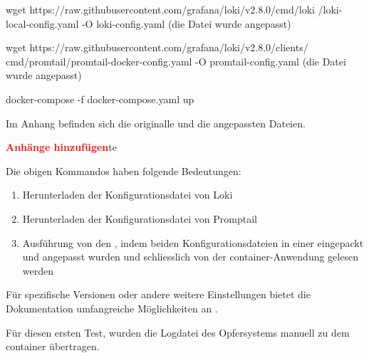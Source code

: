 {
\begin{spverbatim}
wget https://raw.githubusercontent.com/grafana/loki/v2.8.0/cmd/loki
/loki-local-config.yaml -O loki-config.yaml (die Datei wurde angepasst)

wget https://raw.githubusercontent.com/grafana/loki/v2.8.0/clients/
cmd/promtail/promtail-docker-config.yaml -O promtail-config.yaml 
(die Datei wurde angepasst)

docker-compose -f docker-compose.yaml up 
\end{spverbatim}
}


Im Anhang befinden sich die originalle und die angepassten Dateien.

\textcolor{red}{\textbf{Anhänge hinzufügen}}te

Die obigen Kommandos haben folgende Bedeutungen:
\begin{enumerate}[noitemsep]
   \item Herunterladen der Konfigurationsdatei von Loki
   \item Herunterladen der Konfigurationsdatei von Promptail
   \item Ausführung von den , indem beiden Konfigurationsdateien in einer eingepackt und angepasst wurden und schliesslich von der \gls{container}-Anwendung gelesen werden
\end{enumerate}

Für spezifische Versionen oder andere weitere Einstellungen bietet die Dokumentation umfangreiche Möglichkeiten an \citep{GrafanaLoki_run}.

Für diesen ersten Test, wurden die Logdatei des Opfersystems manuell zu dem \gls{container} übertragen.

